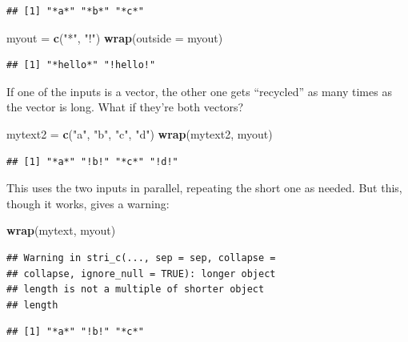 \documentclass[]{tufte-book}
\newenvironment{Shaded}{}{}
\newcommand{\DataTypeTok}[1]{\textcolor[rgb]{0.56,0.13,0.00}{#1}}
\newcommand{\KeywordTok}[1]{\textcolor[rgb]{0.00,0.44,0.13}{\textbf{#1}}}
\newcommand{\NormalTok}[1]{#1}
\newcommand{\StringTok}[1]{\textcolor[rgb]{0.25,0.44,0.63}{#1}}
\theoremstyle{definition}
\theoremstyle{definition}
\theoremstyle{definition}
\theoremstyle{remark}
\begin{document}
\begin{verbatim}
## [1] "*a*" "*b*" "*c*"
\end{verbatim}

\begin{Shaded}
\begin{Highlighting}[]
\NormalTok{myout =}\StringTok{ }\KeywordTok{c}\NormalTok{(}\StringTok{"*"}\NormalTok{, }\StringTok{"!"}\NormalTok{)}
\KeywordTok{wrap}\NormalTok{(}\DataTypeTok{outside =}\NormalTok{ myout)}
\end{Highlighting}
\end{Shaded}

\begin{verbatim}
## [1] "*hello*" "!hello!"
\end{verbatim}

If one of the inputs is a vector, the other one gets ``recycled'' as
many times as the vector is long. What if they're both vectors?

\begin{Shaded}
\begin{Highlighting}[]
\NormalTok{mytext2 =}\StringTok{ }\KeywordTok{c}\NormalTok{(}\StringTok{"a"}\NormalTok{, }\StringTok{"b"}\NormalTok{, }\StringTok{"c"}\NormalTok{, }\StringTok{"d"}\NormalTok{)}
\KeywordTok{wrap}\NormalTok{(mytext2, myout)}
\end{Highlighting}
\end{Shaded}

\begin{verbatim}
## [1] "*a*" "!b!" "*c*" "!d!"
\end{verbatim}

This uses the two inputs in parallel, repeating the short one as needed.
But this, though it works, gives a warning:

\begin{Shaded}
\begin{Highlighting}[]
\KeywordTok{wrap}\NormalTok{(mytext, myout)}
\end{Highlighting}
\end{Shaded}

\begin{verbatim}
## Warning in stri_c(..., sep = sep, collapse =
## collapse, ignore_null = TRUE): longer object
## length is not a multiple of shorter object
## length
\end{verbatim}

\begin{verbatim}
## [1] "*a*" "!b!" "*c*"
\end{verbatim}
\end{document}
